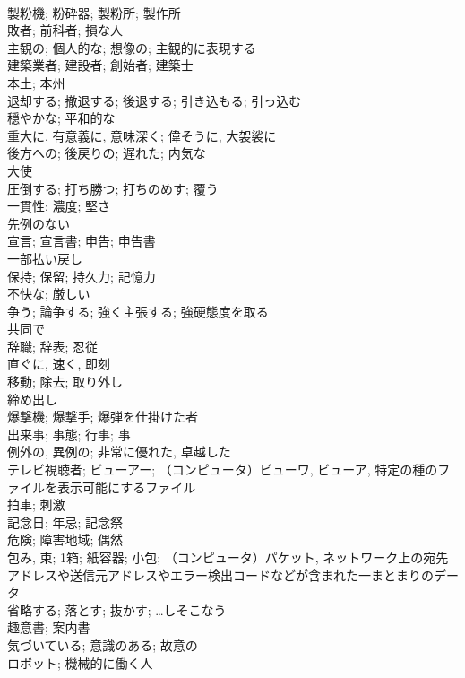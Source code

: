 \documentclass[8pt]{extreport}
\begin{document}
\begin{CJK}{UTF8}{min}
\\	製粉機; 粉砕器; 製粉所; 製作所	
\\	敗者; 前科者; 損な人	
\\	主観の; 個人的な; 想像の; 主観的に表現する	
\\	建築業者; 建設者; 創始者; 建築士	
\\	本土; 本州	
\\	退却する; 撤退する; 後退する; 引き込もる; 引っ込む	
\\	穏やかな; 平和的な	
\\	重大に, 有意義に, 意味深く; 偉そうに, 大袈裟に	
\\	後方への; 後戻りの; 遅れた; 内気な	
\\	大使	
\\	圧倒する; 打ち勝つ; 打ちのめす; 覆う	
\\	一貫性; 濃度; 堅さ	
\\	先例のない	
\\	宣言; 宣言書; 申告; 申告書	
\\	一部払い戻し	
\\	保持; 保留; 持久力; 記憶力	
\\	不快な; 厳しい	
\\	争う; 論争する; 強く主張する; 強硬態度を取る	
\\	共同で	
\\	辞職; 辞表; 忍従	
\\	直ぐに, 速く, 即刻	
\\	移動; 除去; 取り外し	
\\	締め出し	
\\	爆撃機; 爆撃手; 爆弾を仕掛けた者	
\\	出来事; 事態; 行事; 事	
\\	例外の, 異例の; 非常に優れた, 卓越した	
\\	テレビ視聴者; ビューアー; （コンピュータ）ビューワ, ビューア, 特定の種のファイルを表示可能にするファイル	
\\	拍車; 刺激	
\\	記念日; 年忌; 記念祭	
\\	危険; 障害地域; 偶然	
\\	包み, 束; 1箱; 紙容器; 小包; （コンピュータ）パケット, ネットワーク上の宛先アドレスや送信元アドレスやエラー検出コードなどが含まれた一まとまりのデータ	
\\	省略する; 落とす; 抜かす; …しそこなう	
\\	趣意書; 案内書	
\\	気づいている; 意識のある; 故意の	
\\	ロボット; 機械的に働く人	

\end{CJK}
\end{document}
